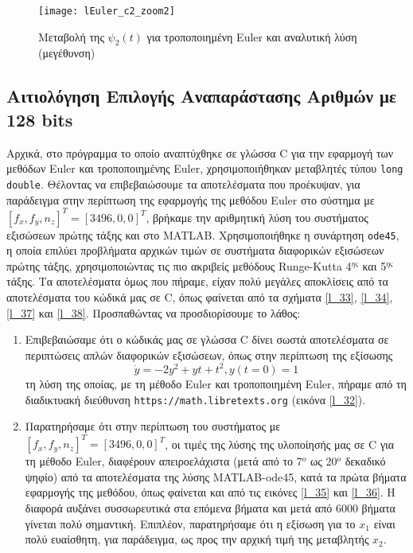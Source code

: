\documentclass{article}
\begin{document}
\begin{figure}[h!]
 \centering
\texttt{[image: lEuler\_c2\_zoom2]}
\caption{Μεταβολή της $\psi_2(t)$ για τροποποιημένη Euler και αναλυτική λύση (μεγέθυνση)}
\end{figure}
 \clearpage





\begin{appendices}
\section{Αιτιολόγηση Επιλογής Αναπαράστασης Αριθμών με 128 bits}
Αρχικά, στο πρόγραμμα το οποίο αναπτύχθηκε σε γλώσσα C για την εφαρμογή των μεθόδων Euler και τροποποιημένης Euler, χρησιμοποιήθηκαν μεταβλητές τύπου \texttt{long double}. Θέλοντας να επιβεβαιώσουμε τα αποτελέσματα που προέκυψαν, για παράδειγμα στην περίπτωση της εφαρμογής της μεθόδου Euler στο σύστημα με \([f_x, f_y, n_z]^T = [3496, 0, 0]^T\), βρήκαμε την αριθμητική λύση του συστήματος εξισώσεων πρώτης τάξης και στο MATLAB. Χρησιμοποιήθηκε η συνάρτηση \texttt{ode45}, η οποία επιλύει προβλήματα αρχικών τιμών σε συστήματα διαφορικών εξισώσεων πρώτης τάξης, χρησιμοποιώντας τις πιο ακριβείς μεθόδους Runge-Kutta 4$^{ης}$ και 5$^{ης}$ τάξης. Τα αποτελέσματα όμως που πήραμε, είχαν πολύ μεγάλες αποκλίσεις από τα αποτελέσματα του κώδικά μας σε C, όπως φαίνεται από τα σχήματα \ref{l_33}, \ref{l_34}, \ref{l_37} και \ref{l_38}. Προσπαθώντας να προσδιορίσουμε το λάθος:
\begin{enumerate}
	\item Επιβεβαιώσαμε ότι ο κώδικάς μας σε γλώσσα C δίνει σωστά αποτελέσματα σε περιπτώσεις απλών διαφορικών εξισώσεων, όπως στην περίπτωση της εξίσωσης
	\[\dot{y}=-2y^2+yt+t^2, y(t=0)=1\]
τη λύση της οποίας, με τη μέθοδο Euler και τροποποιημένη Euler, πήραμε από τη διαδικτυακή διεύθυνση \texttt{https://math.libretexts.org} (εικόνα \ref{l_32}).
	\item Παρατηρήσαμε ότι στην περίπτωση του συστήματος με \([f_x, f_y, n_z]^T = [3496, 0, 0]^T\), οι τιμές της λύσης της υλοποίησής μας σε C για τη μέθοδο Euler, διαφέρουν απειροελάχιστα (μετά από το 7$^{ο}$ ως 20$^{ο}$ δεκαδικό ψηφίο) από τα αποτελέσματα της λύσης MATLAB-ode45, κατά τα πρώτα βήματα εφαρμογής της μεθόδου, όπως φαίνεται και από τις εικόνες \ref{l_35} και \ref{l_36}. Η διαφορά αυξάνει συσσωρευτικά στα επόμενα βήματα και μετά από 6000 βήματα γίνεται πολύ σημαντική. Επιπλέον, παρατηρήσαμε ότι η εξίσωση για το \(x_1\) είναι πολύ ευαίσθητη, για παράδειγμα, ως προς την αρχική τιμή της μεταβλητής \(x_2\).

\end{enumerate}
\end{appendices}
\end{document}
